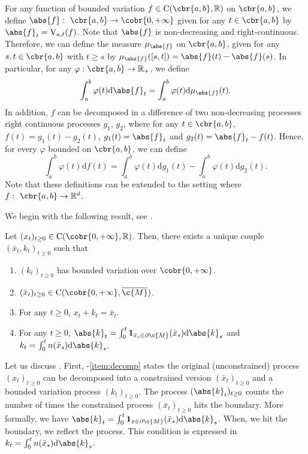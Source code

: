 For any function of bounded variation \(f \in \mathrm{C}(\cbr{a,b}, \R)\) on \(\cbr{a,b}\), we define \(\abs{f}: \ \cbr{a,b} \to \cobr{0,+\infty}\) given for any \(t \in \cbr{a,b}\) by \(\abs{f}_t = \mathrm{V}_{a,t}(f)\).
Note that \(\abs{f}\) is non-decreasing and right-continuous.
Therefore, we can define the measure \(\mu_{\abs{f}}\) on \(\cbr{a,b}\), given for any \(s, t \in \cbr{a,b}\) with \(t \geq s\) by \(\mu_{\abs{f}}([s,t]) = \abs{f}(t) - \abs{f}(s)\).
In particular, for any \(\varphi: \cbr{a,b} \to \R_+\), we define \begin{equation}  \int_a^b \varphi(t) \mathrm{d} \abs{f}_t = \int_a^b \varphi(t) \mathrm{d} \mu_{\abs{f}}(t) .
\end{equation}
In addition, \(f\) can be decomposed in a difference of two non-decreasing processes right continuous processes \(g_1\), \(g_2\), where for any \(t \in \cbr{a,b}\), \(f(t) = g_1(t) - g_2(t)\), \(g_1(t) = \abs{f}_t\) and \(g_2(t) = \abs{f}_t - f(t)\).
Hence, for every \(\varphi\) bounded on \(\cbr{a,b}\), we can define \begin{equation}  \int_a^b \varphi(t) \mathrm{d} f(t) = \int_a^b \varphi(t) \mathrm{d} g_1(t) - \int_a^b \varphi(t) \mathrm{d} g_2(t) .
\end{equation}
Note that these definitions can be extended to the setting where \(f: \ \cbr{a,b} \to \R^d\).

We begin with the following result, see \cite{lions1984stochastic}.

\begin{theorem}
	\label{thm:existence_reflected_det}
	Let \((x_t)_{t \geq 0} \in \mathrm{C}(\cobr{0, +\infty}, \R)\).
	Then, there exists a unique couple \((\bar{x}_t, k_t)_{t \geq 0}\) such that \begin{enumerate}[label=(\alph*)] \item \((k_t)_{t \geq 0}\) has bounded variation over \(\cobr{0,+\infty}\).
		\item \((\bar{x}_t)_{t \geq 0} \in \mathrm{C}(\cobr{0,+\infty}, \cl{\c{M}})\).
		\item For any \(t \geq 0\), \(x_t + k_t = \bar{x}_t\). \label{item:decomp}
		\item For any \(t \geq 0\),
		      \(\abs{k}_t = \int_0^t \mathbf{1}_{\bar{x}_s \in \partial \c{M}}(\bar{x}_s) \mathrm{d} \abs{k}_s\) and
		      \(k_t = \int_0^t n(\bar{x}_s) \mathrm{d} \abs{k}_s\).
	\end{enumerate}
\end{theorem}

Let us discuss .
First, -\ref{item:decomp} states the original (unconstrained) process \((x_t)_{t \geq 0}\) can be decomposed into a constrained version \((\bar{x}_t)_{t \geq 0}\) and a bounded variation process \((k_t)_{t \geq 0}\).
The process \((\abs{k}_t)_{t \geq 0}\) counts the number of times the constrained process \((\bar{x}_t)_{t \geq 0}\) hits the boundary.
More formally, we have \(\abs{k}_t = \int_0^t \mathbf{1}_{x \in \partial \c{M}}(\bar{x}_s) \mathrm{d} \abs{k}_s\).
When, we hit the boundary, we reflect the process.
This condition is expressed in \(k_t = \int_0^t n(\bar{x}_s) \mathrm{d} \abs{k}_s\).

